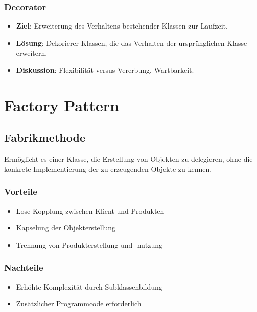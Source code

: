 \documentclass[11pt, a4paper]{article}
\begin{document}
\subsubsection{Decorator}
\begin{itemize}
    \item \textbf{Ziel}: Erweiterung des Verhaltens bestehender Klassen zur Laufzeit.
    \item \textbf{Lösung}: Dekorierer-Klassen, die das Verhalten der ursprünglichen Klasse erweitern.
    \item \textbf{Diskussion}: Flexibilität versus Vererbung, Wartbarkeit.
\end{itemize}

\newpage


\section{Factory Pattern} %

\subsection{Fabrikmethode}

Ermöglicht es einer Klasse, die Erstellung von Objekten zu delegieren, ohne die konkrete Implementierung der zu erzeugenden Objekte zu kennen.

\subsubsection*{Vorteile}
\begin{itemize}
    \item Lose Kopplung zwischen Klient und Produkten
    \item Kapselung der Objekterstellung
    \item Trennung von Produkterstellung und -nutzung
\end{itemize}

\subsubsection*{Nachteile}
\begin{itemize}
    \item Erhöhte Komplexität durch Subklassenbildung
    \item Zusätzlicher Programmcode erforderlich
\end{itemize}
\end{document}
